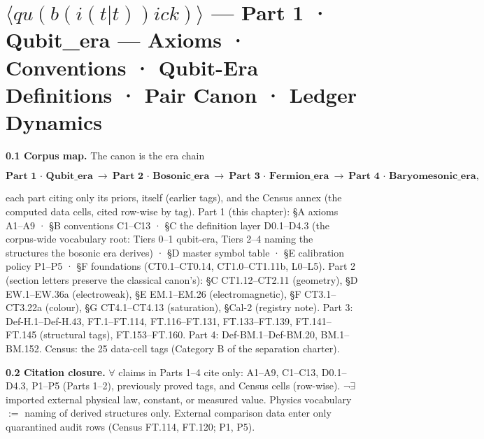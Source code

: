 \chapter{\texorpdfstring{$\langle qu(b(i(t|t))ick)\rangle$ — \textbf{Part 1 · Qubit\_era} — Axioms · Conventions · Qubit-Era Definitions · Pair Canon · Ledger Dynamics}{Qubitick - **Part 1 - Qubit _era** - Axioms - Conventions - Qubit-Era Definitions - Pair Canon - Ledger Dynamics}}

\textbf{0.1 Corpus map.} The canon is the era chain

\[
\textbf{Part 1 · Qubit\_era}\ \longrightarrow\ \textbf{Part 2 · Bosonic\_era}\ \longrightarrow\ \textbf{Part 3 · Fermion\_era}\ \longrightarrow\ \textbf{Part 4 · Baryomesonic\_era},
\]

each part citing only its priors, itself (earlier tags), and the Census annex (the computed data cells, cited row-wise by tag). Part 1 (this chapter): §A axioms A1–A9 · §B conventions C1–C13 · §C the definition layer D0.1–D4.3 (the corpus-wide vocabulary root: Tiers 0–1 qubit-era, Tiers 2–4 naming the structures the bosonic era derives) · §D master symbol table · §E calibration policy P1–P5 · §F foundations (CT0.1–CT0.14, CT1.0–CT1.11b, L0–L5). Part 2 (section letters preserve the classical canon's): §C CT1.12–CT2.11 (geometry), §D EW.1–EW.36a (electroweak), §E EM.1–EM.26 (electromagnetic), §F CT3.1–CT3.22a (colour), §G CT4.1–CT4.13 (saturation), §Cal-2 (registry note). Part 3: Def-H.1–Def-H.43, FT.1–FT.114, FT.116–FT.131, FT.133–FT.139, FT.141–FT.145 (structural tags), FT.153–FT.160. Part 4: Def-BM.1–Def-BM.20, BM.1–BM.152. Census: the 25 data-cell tags (Category B of the separation charter).

\textbf{0.2 Citation closure.} $\forall$ claims in Parts 1–4 cite only: A1–A9, C1–C13, D0.1–D4.3, P1–P5 (Parts 1–2), previously proved tags, and Census cells (row-wise). $\neg\exists$ imported external physical law, constant, or measured value. Physics vocabulary $:=$ naming of derived structures only. External comparison data enter only quarantined audit rows (Census FT.114, FT.120; P1, P5).

